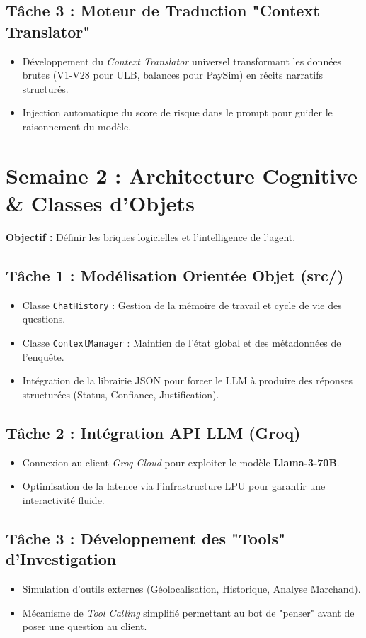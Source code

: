 \documentclass[a4paper,11pt]{article}
\begin{document}
\subsection{Tâche 3 : Moteur de Traduction "Context Translator"}
\begin{itemize}
    \item Développement du \textit{Context Translator} universel transformant les données brutes (V1-V28 pour ULB, balances pour PaySim) en récits narratifs structurés.
    \item Injection automatique du score de risque dans le prompt pour guider le raisonnement du modèle.
\end{itemize}

\section{Semaine 2 : Architecture Cognitive \& Classes d'Objets}
\textbf{Objectif :} Définir les briques logicielles et l'intelligence de l'agent.

\subsection{Tâche 1 : Modélisation Orientée Objet (src/)}
\begin{itemize}
    \item Classe \texttt{ChatHistory} : Gestion de la mémoire de travail et cycle de vie des questions.
    \item Classe \texttt{ContextManager} : Maintien de l'état global et des métadonnées de l'enquête.
    \item Intégration de la librairie JSON pour forcer le LLM à produire des réponses structurées (Status, Confiance, Justification).
\end{itemize}

\subsection{Tâche 2 : Intégration API LLM (Groq)}
\begin{itemize}
    \item Connexion au client \textit{Groq Cloud} pour exploiter le modèle \textbf{Llama-3-70B}.
    \item Optimisation de la latence via l'infrastructure LPU pour garantir une interactivité fluide.
\end{itemize}

\subsection{Tâche 3 : Développement des "Tools" d'Investigation}
\begin{itemize}
    \item Simulation d'outils externes (Géolocalisation, Historique, Analyse Marchand).
    \item Mécanisme de \textit{Tool Calling} simplifié permettant au bot de "penser" avant de poser une question au client.
\end{itemize}
\end{document}
